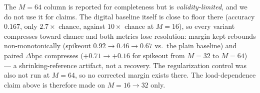 The $M{=}64$ column is reported for completeness but is \emph{validity-limited}, and we do
not use it for claims. The digital baseline itself is close to floor there (accuracy $0.167$,
only $2.7\times$ chance, against $10\times$ chance at $M{=}16$), so every variant compresses
toward chance and both metrics lose resolution: margin kept rebounds non-monotonically
(spikeout $0.92 \rightarrow 0.46 \rightarrow 0.67$ vs.\ the plain baseline) and paired
$\Delta$bpc compresses ($+0.71 \rightarrow +0.16$ for spikeout from $M{=}32$ to $M{=}64$) ---
a shrinking-reference artifact, not a recovery. The regularization control was also not run
at $M{=}64$, so no corrected margin exists there. The load-dependence claim above is
therefore made on $M{=}16 \rightarrow 32$ only.
